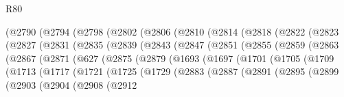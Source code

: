\begin{lexlean}{R80}
\begin{coremodule}
          (@2790
            (@2794
              (@2798
                (@2802
                  (@2806
                    (@2810
                      (@2814
                        (@2818
                          (@2822
                            (@2823
                              (@2827
                                (@2831
                                  (@2835
                                    (@2839
                                      (@2843
                                        (@2847
                                          (@2851
                                            (@2855
                                              (@2859
                                                (@2863
                                                  (@2867
                                                    (@2871
                                                      (@627
                                                        (@2875
                                                          (@2879
                                                            (@1693
                                                              (@1697
                                                                (@1701
                                                                  (@1705
                                                                    (@1709
                                                                      (@1713
                                                                        (@1717
                                                                          (@1721
                                                                            (@1725
                                                                              (@1729
                                                                                (@2883
                                                                                  (@2887
                                                                                    (@2891
                                                                                      (@2895
                                                                                        (@2899
                                                                                          (@2903
                                                                                            (@2904
                                                                                              (@2908
                                                                                                (@2912

\end{coremodule}
\end{lexlean}
